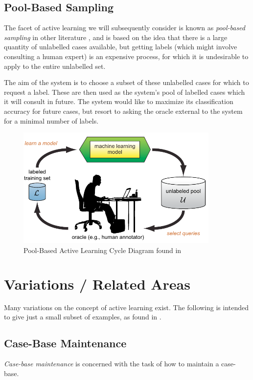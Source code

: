 \documentclass[a4paper,11pt]{report}
\begin{document}
\subsection{Pool-Based Sampling}

The facet of active learning we will subsequently consider is known as \emph{pool-based sampling} in other literature \citep{Settles2010}, and is based on the idea that there is a large quantity of unlabelled cases available, but getting labels (which might involve consulting a human expert) is an expensive process, for which it is undesirable to apply to the entire unlabelled set. 

The aim of the system is to choose a subset of these unlabelled cases for which to request a label. These are then used as the system's pool of labelled cases which it will consult in future. The system would like to maximize its classification accuracy for future cases, but resort to asking the oracle external to the system for a minimal number of labels.

\begin{figure}[h!] \centering
\includegraphics[width=10cm]{./Others/Settles2010PoolBasedImage}
\caption*{Pool-Based Active Learning Cycle Diagram found in \citet{Settles2010}}
\end{figure}

\section{Variations / Related Areas}
Many variations on the concept of active learning exist. The following is intended to give just a small subset of examples, as found in \citet{Settles2010}.

\subsection{Case-Base Maintenance}
\emph{Case-base maintenance} is concerned with the task of how to maintain a case-base. 
\end{document}
